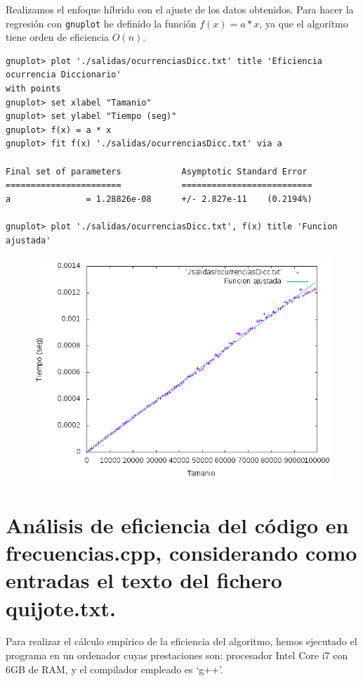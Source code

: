 \documentclass[11pt]{article}
\begin{document}
Realizamos el enfoque híbrido con el ajuste de los datos obtenidos. Para hacer la regresión con \texttt{gnuplot} he definido la función $f(x) = a * x$, ya que el algoritmo tiene orden de eficiencia $O(n)$.

\begin{verbatim}
gnuplot> plot './salidas/ocurrenciasDicc.txt' title 'Eficiencia ocurrencia Diccionario' 
with points
gnuplot> set xlabel "Tamanio"
gnuplot> set ylabel "Tiempo (seg)"
gnuplot> f(x) = a * x
gnuplot> fit f(x) './salidas/ocurrenciasDicc.txt' via a

Final set of parameters            Asymptotic Standard Error
=======================            ==========================
a               = 1.28826e-08      +/- 2.827e-11    (0.2194%)

gnuplot> plot './salidas/ocurrenciasDicc.txt', f(x) title 'Funcion ajustada'
\end{verbatim}

\begin{figure}[H]
\begin{center}
\includegraphics[width=12cm]{../salidas/ocurrenciasDicc.png}
\end{center}
\end{figure}


\section{Análisis de eficiencia del código en frecuencias.cpp, considerando como entradas el texto del fichero quijote.txt.}

Para realizar el cálculo empírico de la eficiencia del algoritmo, hemos ejecutado el programa en un ordenador cuyas prestaciones son: procesador Intel Core i7 con 6GB de RAM, y el compilador empleado es `g++'.\\
\end{document}
